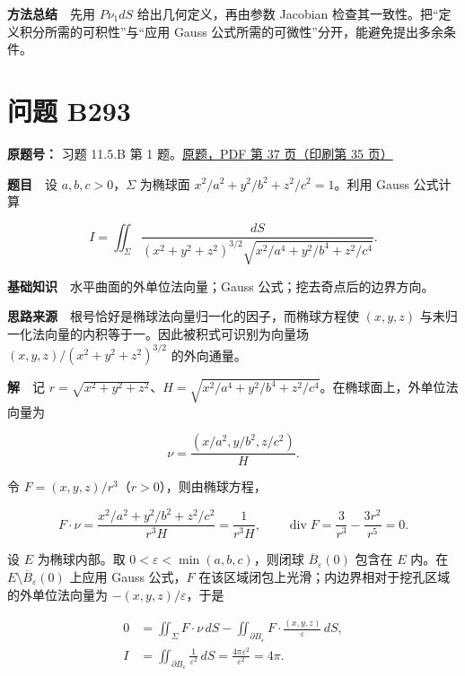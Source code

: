 \documentclass[11pt,a4paper]{article}
\begin{document}
\textbf{方法总结}　先用 \(P\nu_1dS\) 给出几何定义，再由参数 Jacobian
检查其一致性。把``定义积分所需的可积性''与``应用 Gauss
公式所需的可微性''分开，能避免提出多余条件。

\section{问题 B293}\label{ux95eeux9898-b293}

\textbf{原题号：} 习题 11.5.B 第 1
题。\href{https://zj139.github.io/math-notes/files/problems/楼分析习题-v2.pdf\#page=37}{原题，PDF
第 37 页（印刷第 35 页）}

\textbf{题目}　设 \(a,b,c>0\)，\(\Sigma\) 为椭球面
\(x^2/a^2+y^2/b^2+z^2/c^2=1\)。利用 Gauss 公式计算

\begin{equation}
I=\iint_\Sigma
\frac{dS}{(x^2+y^2+z^2)^{3/2}
\sqrt{x^2/a^4+y^2/b^4+z^2/c^4}}.
\tag{25}
\end{equation}

\textbf{基础知识}　水平曲面的外单位法向量；Gauss
公式；挖去奇点后的边界方向。

\textbf{思路来源}　根号恰好是椭球法向量归一化的因子，而椭球方程使
\((x,y,z)\) 与未归一化法向量的内积等于一。因此被积式可识别为向量场
\((x,y,z)/(x^2+y^2+z^2)^{3/2}\) 的外向通量。

\textbf{解}　记
\(r=\sqrt{x^2+y^2+z^2}\)、\(H=\sqrt{x^2/a^4+y^2/b^4+z^2/c^4}\)。在椭球面上，外单位法向量为

\begin{equation}
\nu=\frac{(x/a^2,y/b^2,z/c^2)}{H}.
\tag{26}
\end{equation}

令 \(F=(x,y,z)/r^3\)（\(r>0\)），则由椭球方程，

\begin{equation}
F\cdot\nu=\frac{x^2/a^2+y^2/b^2+z^2/c^2}{r^3H}
=\frac1{r^3H},\qquad
\operatorname{div}F=\frac3{r^3}-\frac{3r^2}{r^5}=0.
\tag{27}
\end{equation}

设 \(E\) 为椭球内部。取 \(0<\varepsilon<\min(a,b,c)\)，则闭球
\(\overline B_\varepsilon(0)\) 包含在 \(E\) 内。在
\(E\setminus\overline B_\varepsilon(0)\) 上应用 Gauss 公式，\(F\)
在该区域闭包上光滑；内边界相对于挖孔区域的外单位法向量为
\(-(x,y,z)/\varepsilon\)，于是

\begin{equation}
\begin{aligned}
0&=\iint_\Sigma F\cdot\nu\,dS
-\iint_{\partial B_\varepsilon}
F\cdot\frac{(x,y,z)}{\varepsilon}\,dS,\\
I&=\iint_{\partial B_\varepsilon}\frac1{\varepsilon^2}\,dS
=\frac{4\pi\varepsilon^2}{\varepsilon^2}=4\pi.
\end{aligned}
\tag{28}
\end{equation}
\end{document}
